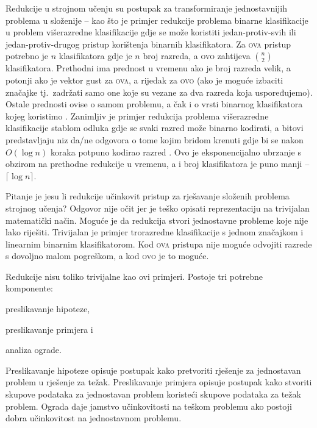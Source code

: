 Redukcije u strojnom učenju su postupak za transformiranje jednostavnijih
problema u složenije -- kao što je primjer redukcije problema binarne
klasifikacije u problem višerazredne klasifikacije gdje se može koristiti
jedan-protiv-svih  ili jedan-protiv-drugog
 pristup korištenja binarnih klasifikatora. Za
\textsc{ova} pristup potrebno je $n$ klasifikatora gdje je $n$ broj razreda, a
\textsc{ovo} zahtijeva $\binom{n}{2}$ klasifikatora. Prethodni ima prednost u
vremenu ako je broj razreda velik, a potonji ako je vektor gust za \textsc{ova},
a rijedak za \textsc{ovo} (ako je moguće izbaciti značajke tj.~zadržati samo one
koje su vezane za dva razreda koja uspoređujemo). Ostale prednosti ovise o samom
problemu, a čak i o vrsti binarnog klasifikatora kojeg koristimo
\citep{milgram2006one}. Zanimljiv je primjer redukcija problema višerazredne
klasifikacije stablom odluka  gdje se svaki razred može
binarno kodirati, a bitovi predstavljaju niz da/ne odgovora o tome kojim bridom
krenuti gdje bi se nakon $O(\log n)$ koraka potpuno kodirao razred
\citep{beygelzimer2009error, daume2016one}. Ovo je eksponencijalno ubrzanje s
obzirom na prethodne redukcije u vremenu, a i broj klasifikatora je puno manji -- $\lceil \log n \rceil$.

Pitanje je jesu li redukcije učinkovit pristup za rješavanje složenih problema
strojnog učenja? Odgovor nije očit jer je teško opisati reprezentaciju na
trivijalan matematički način. Moguće je da redukcija stvori jednostavne probleme
koje nije lako riješiti. Trivijalan je primjer trorazredne klasifikacije s
jednom značajkom i linearnim binarnim klasifikatorom. Kod \textsc{ova} pristupa
nije moguće odvojiti razrede s dovoljno malom pogreškom, a kod \textsc{ovo} je
to moguće.

Redukcije nisu toliko trivijalne kao ovi primjeri. Postoje tri potrebne
komponente:
\begin{inlinelist}
  \item preslikavanje hipoteze,
  \item preslikavanje primjera i
  \item analiza ograde.
\end{inlinelist}
Preslikavanje hipoteze opisuje postupak kako pretvoriti rješenje za jednostavan
problem u rješenje za težak. Preslikavanje primjera opisuje postupak kako
stvoriti skupove podataka za jednostavan problem koristeći skupove podataka za
težak problem. Ograda daje jamstvo učinkovitosti na teškom problemu ako postoji
dobra učinkovitost na jednostavnom problemu.

